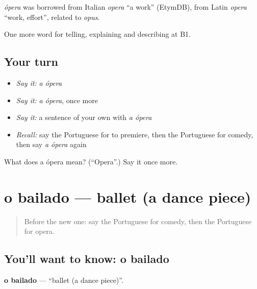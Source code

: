 \begin{cousinweb}
\emph{ópera} was borrowed from Italian \emph{opera} \textquotedblleft{}a work\textquotedblright{} (EtymDB), from Latin \emph{opera} \textquotedblleft{}work, effort\textquotedblright{}, related to \emph{opus}.
\end{cousinweb}

\begin{grammarlens}[title={What you've built}]
One more word for telling, explaining and describing at B1.
\end{grammarlens}

\subsection*{Your turn}
\begin{itemize}
\raggedright
  \item \emph{Say it:} \emph{a ópera}
  \item \emph{Say it:} \emph{a ópera}, once more
  \item \emph{Say it:} a sentence of your own with \emph{a ópera}
  \item \emph{Recall:} say the Portuguese for to premiere, then the Portuguese for comedy, then say \emph{a ópera} again
\end{itemize}

\begin{tcolorbox}[breakable,colback=teal!4,colframe=teal!35!black,title={Before you move on}]
What does a ópera mean? (\textquotedblleft{}Opera\textquotedblright{}.) Say it once more.
\end{tcolorbox}
\section[o bailado]{o bailado — ballet (a dance piece)}

\label{lesson:PT-C521-bailado}



\begin{quote}
Before the new one: say the Portuguese for comedy, then the Portuguese for opera.
\end{quote}

\subsection*{You'll want to know: o bailado}
\textbf{o bailado} — \textquotedblleft{}ballet (a dance piece)\textquotedblright{}.

